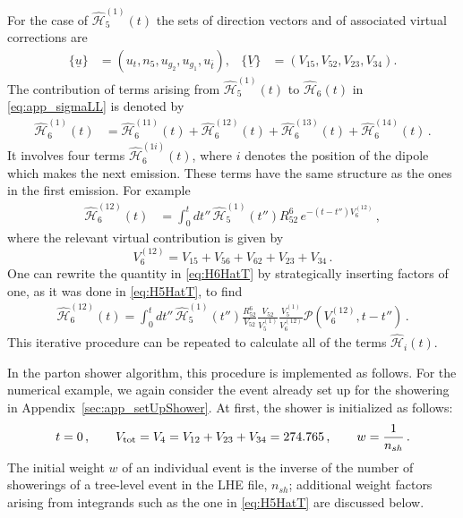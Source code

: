\documentclass[11pt,a4paper]{article}
\begin{document}
For the case of $\mathcal{\hat{H}}^{(1)}_5(t)$ the sets of direction vectors and of associated virtual corrections are
\begin{align}
\{ \underline{u}\}&=\left(u_t,n_5,u_{g_2},u_{g_1},u_{\bar{t}}\right) , & \{\underline{V} \} &=\left(V_{15},V_{52},V_{23},V_{34}\right)  .
\end{align}
The contribution of terms arising from $\mathcal{\hat{H}}^{(1)}_5(t)$ to $\mathcal{\hat{H}}_6(t)$ in \eqref{eq:app_sigmaLL} is denoted by
\begin{align}
\mathcal{\hat{H}}^{(1)}_6(t)&= \mathcal{\hat{H}}^{(11)}_6(t) + \mathcal{\hat{H}}^{(12)}_6(t)  + \mathcal{\hat{H}}^{(13)}_6(t) +  \mathcal{\hat{H}}^{(14)}_6(t) \, .
\end{align}
It involves four terms $\mathcal{\hat{H}}^{(1i)}_6(t) $, where $i$ denotes the position of the dipole which makes the next emission. These terms have the same structure as the ones in the first emission. For example
\begin{align}\label{eq:H6HatT}
 \mathcal{\hat{H}}^{(12)}_6(t) &= \int_{0}^{t} dt'' \,\mathcal{\hat{H}}^{(1)}_{5}(t'') R_{52}^6\, e^{-(t-t'') V_6^{(12)}} \, ,
 \end{align}
 where the relevant virtual contribution is given by
 \begin{equation}
V_6^{(12)} = V_{15}+ V_{56}+ V_{62}+ V_{23} +V_{34} \, .
\end{equation}
One can rewrite the quantity in \eqref{eq:H6HatT} by strategically inserting factors of one, as it was done in  \eqref{eq:H5HatT}, to find
\begin{align} 
 \mathcal{\hat{H}}^{(12)}_6(t) =\int_{0}^{t} dt'' \,\mathcal{\hat{H}}^{(1)}_{5}(t'') \frac{R_{52}^6}{V_{52}} \frac{V_{52}}{V_5^{(1)}}\frac{V_5^{(1)}}{V_6^{(12)}} \mathcal{P}( V_6^{(12)}, t-t'' ) \, .
\end{align}
This iterative procedure  can be repeated to calculate all of the terms $\mathcal{\hat{H}}_{i}(t)$.

In the parton shower algorithm, this procedure is implemented  as follows. For the numerical example, we again consider the event already set up for the showering in Appendix~\ref{sec:app_setUpShower}. At first, the shower is initialized as follows:
\begin{equation}
t=0 \, , \qquad  V_{{\rm tot}}= V_4 = V_{12} + V_{23} + V_{34} = 274.765 \, , \qquad w=\frac{1}{n_{sh}}\,.
\end{equation}
The initial weight $w$ of an individual event is the inverse of the number of showerings of a tree-level event in the LHE file, $n_{sh}$; additional weight factors arising from integrands such as the one in \eqref{eq:H5HatT} are discussed below.
\end{document}
